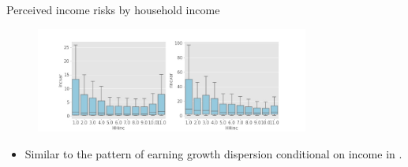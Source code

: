 \documentclass{beamer}
\begin{document}
\begin{frame}{Perceived income risks by household income}
	\begin{figure}
		\centering
		\label{boxplot_hhinc}
		\includegraphics[width=0.8\textwidth]{figures/boxplot_var_HHinc}
	\end{figure}
	\begin{itemize}
		\item Similar to the pattern of earning growth dispersion conditional on income in \cite{bloom2018great}. 
	\end{itemize}
\end{frame}
\end{document}
